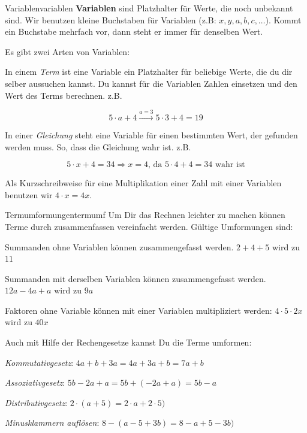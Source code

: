 \documentclass[12pt,a5paper,landscape]{scrartcl}
\begin{document}
\begin{hilfekarte}{Variablen}{variablen}
	\textbf{Variablen} sind Platzhalter für Werte, die noch unbekannt sind. Wir benutzen kleine Buchstaben für Variablen (z.B: $x,y,a,b,c,\dots$). Kommt ein Buchstabe mehrfach vor, dann steht er immer für denselben Wert.
	
	Es gibt zwei Arten von Variablen:
	
	In einem \emph{Term} ist eine Variable ein Platzhalter für beliebige Werte, die du dir selber aussuchen kannst. Du kannst für die Variablen Zahlen einsetzen und den Wert des Terms berechnen. z.B.
	
	\[ 5\cdot a + 4 \overset{a = 3}{\longrightarrow} 5\cdot 3 + 4 = 19 \]
	
	In einer \emph{Gleichung} steht eine Variable für einen bestimmten Wert, der gefunden werden muss. So, dass die Gleichung wahr ist. z.B.
	
	\[ 5\cdot x + 4 = 34 \Rightarrow x = 4 \text{, da } 5\cdot 4 + 4 = 34\text{ wahr ist} \]

	Als Kurzschreibweise für eine Multiplikation einer Zahl mit einer Variablen benutzen wir $4\cdot x = 4x$.
\end{hilfekarte}

\leereKarte

\begin{hilfekarte}{Termumformungen}{termumf}
	Um Dir das Rechnen leichter zu machen können Terme durch zusammenfassen vereinfacht werden. Gültige Umformungen sind:
	
	\begin{smallitemize}
		\item Summanden ohne Variablen können zusammengefasst werden. $2 + 4 + 5$ wird zu $11$
		\item Summanden mit derselben Variablen können zusammengefasst werden. $12a - 4a + a$ wird zu $9a$
		\item Faktoren ohne Variable können mit einer Variablen multipliziert werden: $4\cdot 5\cdot 2x$ wird zu $40x$
	\end{smallitemize}
	
	Auch mit Hilfe der Rechengesetze kannst Du die Terme umformen:
	\begin{smallitemize}
		\item \emph{Kommutativgesetz}: $4a + b + 3a = 4a + 3a + b = 7a + b$
		\item \emph{Assoziativgesetz}: $5b - 2a + a = 5b + (-2a + a) = 5b - a$
		\item \emph{Distributivgesetz}: $2\cdot (a + 5) = 2\cdot a + 2\cdot 5)$
		\item \emph{Minusklammern auflösen}: $8 -(a - 5 + 3b) = 8 - a + 5 - 3b)$
	\end{smallitemize}
\end{hilfekarte}
\end{document}
